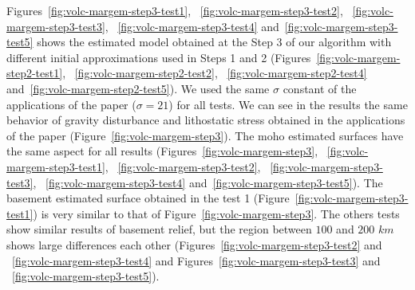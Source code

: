 \documentclass[manuscript]{geophysics}
\begin{document}
Figures~\ref{fig:volc-margem-step3-test1}, ~\ref{fig:volc-margem-step3-test2}, ~\ref{fig:volc-margem-step3-test3}, ~\ref{fig:volc-margem-step3-test4} and~\ref{fig:volc-margem-step3-test5} shows the estimated model obtained at the Step 3 of our algorithm with different initial approximations used in Steps 1 and 2 (Figures~\ref{fig:volc-margem-step2-test1}, ~\ref{fig:volc-margem-step2-test2}, ~\ref{fig:volc-margem-step2-test4} and~\ref{fig:volc-margem-step2-test5}). We used the same $\sigma$ constant of the applications of the paper ($\sigma = 21$) for all tests. We can see in the results the same behavior of gravity disturbance and lithostatic stress obtained in the applications of the paper (Figure~\ref{fig:volc-margem-step3}). The moho estimated surfaces have the same aspect for all results (Figures~\ref{fig:volc-margem-step3}, ~\ref{fig:volc-margem-step3-test1}, ~\ref{fig:volc-margem-step3-test2}, ~\ref{fig:volc-margem-step3-test3}, ~\ref{fig:volc-margem-step3-test4} and~\ref{fig:volc-margem-step3-test5}). The basement estimated surface obtained in the test 1 (Figure~\ref{fig:volc-margem-step3-test1}) is very similar to that of Figure~\ref{fig:volc-margem-step3}. The others tests show similar results of basement relief, but the region between $100$ and $200$ $km$ shows large differences each other (Figures~\ref{fig:volc-margem-step3-test2} and ~\ref{fig:volc-margem-step3-test4} and Figures~\ref{fig:volc-margem-step3-test3} and ~\ref{fig:volc-margem-step3-test5}). 



\end{document}
